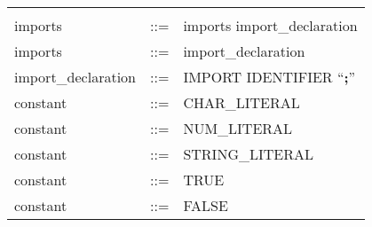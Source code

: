 \documentclass[11pt]{article}
\begin{document}
\begin{longtable}{lrl}
\begin{minipage}[t]{\rulerhs}
  \end{minipage}                                                             \\
imports                                    & ::= &
  \begin{minipage}[t]{\rulerhs}
    \raggedright
    imports import\_declaration
  \end{minipage}                                                             \\
imports                                    & ::= &
  \begin{minipage}[t]{\rulerhs}
    \raggedright
    import\_declaration
  \end{minipage}                                                             \\
import\_declaration                        & ::= &
  \begin{minipage}[t]{\rulerhs}
    \raggedright
    IMPORT IDENTIFIER ``{\bf ;}''
  \end{minipage}                                                             \\
constant                                   & ::= &
  \begin{minipage}[t]{\rulerhs}
    \raggedright
    CHAR\_LITERAL
  \end{minipage}                                                             \\
constant                                   & ::= &
  \begin{minipage}[t]{\rulerhs}
    \raggedright
    NUM\_LITERAL
  \end{minipage}                                                             \\
constant                                   & ::= &
  \begin{minipage}[t]{\rulerhs}
    \raggedright
    STRING\_LITERAL
  \end{minipage}                                                             \\
constant                                   & ::= &
  \begin{minipage}[t]{\rulerhs}
    \raggedright
    TRUE
  \end{minipage}                                                             \\
constant                                   & ::= &
  \begin{minipage}[t]{\rulerhs}
    \raggedright
    FALSE
  \end{minipage}                                                             \\

\end{longtable}
\end{document}
